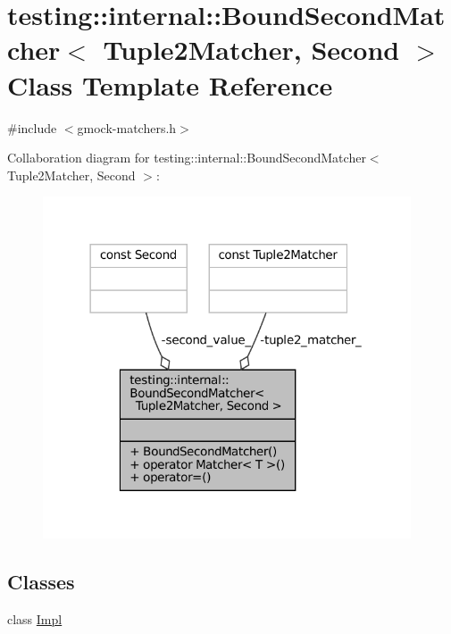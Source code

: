 \hypertarget{classtesting_1_1internal_1_1BoundSecondMatcher}{}\section{testing\+:\+:internal\+:\+:Bound\+Second\+Matcher$<$ Tuple2\+Matcher, Second $>$ Class Template Reference}
\label{classtesting_1_1internal_1_1BoundSecondMatcher}


{\ttfamily \#include $<$gmock-\/matchers.\+h$>$}



Collaboration diagram for testing\+:\+:internal\+:\+:Bound\+Second\+Matcher$<$ Tuple2\+Matcher, Second $>$\+:
\nopagebreak
\begin{figure}[H]
\begin{center}
\leavevmode
\includegraphics[width=309pt]{classtesting_1_1internal_1_1BoundSecondMatcher__coll__graph}
\end{center}
\end{figure}
\subsection*{Classes}
\begin{DoxyCompactItemize}
\item 
class \hyperlink{classtesting_1_1internal_1_1BoundSecondMatcher_1_1Impl}{Impl}
\end{DoxyCompactItemize}
